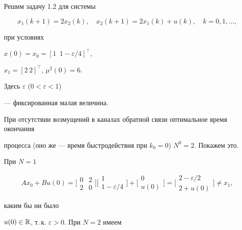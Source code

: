 \begin{exams}


Решим задачу 1.2 для системы


\begin{equation}\label{4.6}


x_1(k+1) = 2 x_2(k), \quad x_2(k+1) = 


2 x_1(k)+u(k),\quad k=0, 1,\dotsc,


\end{equation}


при условиях


$x(0)=x_0=[1\; \ 1-\varepsilon/4]^{\top}$,


$x_1=[2\ 2]^{\top}$, $\mu^2(0)=6$.


Здесь $\varepsilon$ ($0<\varepsilon<1$)


--- фиксированная малая величина.





При отсутствии возмущений в каналах обратной связи оптимальное время окончания


процесса (оно же --- время быстродействия при $k_0=0$) $N^0=2$. Покажем это.


При $N=1$


$$


A x_0+Bu(0)= \bigl[


\begin{smallmatrix}


0&2 \\ 2&0


\end{smallmatrix} \bigr]  \bigl[


\begin{smallmatrix} 1 \\ 1-\varepsilon/4\end{smallmatrix} \bigr] + \bigl[


\begin{smallmatrix} 0\\u(0)\end{smallmatrix} \bigr]=\bigl[\begin{smallmatrix}


2-\varepsilon/2\\ 2+u(0)\end{smallmatrix}\bigr]\ne x_1,


$$


каким бы ни было


$u(0)\in\Bbb{R}$, т.\,к. $\varepsilon>0$. При $N=2$ имеем


\begin{gather*}



\end{gather*}
\end{exams}
